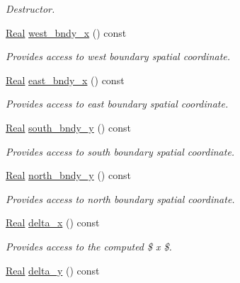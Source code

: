 \begin{DoxyCompactItemize}
\begin{DoxyCompactList}\small\item\em Destructor. \end{DoxyCompactList}\item 
\hyperlink{group__c01-roots_gac080bbbf5cbb5502c9f00405f894857d}{Real} \hyperlink{classmtk_1_1UniStgGrid2D_a95b1041558be5bbb087f508d2efbac96}{west\-\_\-bndy\-\_\-x} () const 
\begin{DoxyCompactList}\small\item\em Provides access to west boundary spatial coordinate. \end{DoxyCompactList}\item 
\hyperlink{group__c01-roots_gac080bbbf5cbb5502c9f00405f894857d}{Real} \hyperlink{classmtk_1_1UniStgGrid2D_aa626e15a5c494d8de0bf4882bc62a756}{east\-\_\-bndy\-\_\-x} () const 
\begin{DoxyCompactList}\small\item\em Provides access to east boundary spatial coordinate. \end{DoxyCompactList}\item 
\hyperlink{group__c01-roots_gac080bbbf5cbb5502c9f00405f894857d}{Real} \hyperlink{classmtk_1_1UniStgGrid2D_abf94d51c0dfee07840e1603dfdc49643}{south\-\_\-bndy\-\_\-y} () const 
\begin{DoxyCompactList}\small\item\em Provides access to south boundary spatial coordinate. \end{DoxyCompactList}\item 
\hyperlink{group__c01-roots_gac080bbbf5cbb5502c9f00405f894857d}{Real} \hyperlink{classmtk_1_1UniStgGrid2D_aecdc70b590cff2fef54c60f9f7afc0b6}{north\-\_\-bndy\-\_\-y} () const 
\begin{DoxyCompactList}\small\item\em Provides access to north boundary spatial coordinate. \end{DoxyCompactList}\item 
\hyperlink{group__c01-roots_gac080bbbf5cbb5502c9f00405f894857d}{Real} \hyperlink{classmtk_1_1UniStgGrid2D_ac56877b3c19cfd8cc426f6187f18f5b1}{delta\-\_\-x} () const 
\begin{DoxyCompactList}\small\item\em Provides access to the computed \$  x \$. \end{DoxyCompactList}\item 
\hyperlink{group__c01-roots_gac080bbbf5cbb5502c9f00405f894857d}{Real} \hyperlink{classmtk_1_1UniStgGrid2D_a568db235ac03728269b551749b106620}{delta\-\_\-y} () const 

\end{DoxyCompactItemize}
